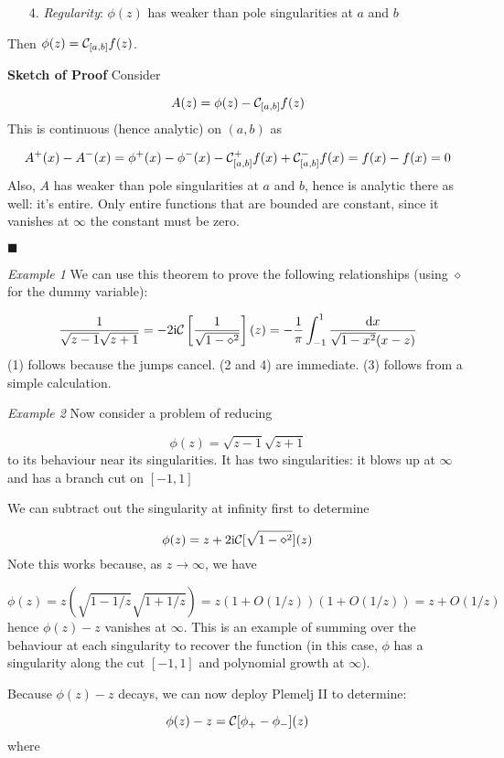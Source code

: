 \documentclass[12pt,a4paper]{article}
\def\D{ {\rm d} }
\def\I{ {\rm i} }
\def\CC{ {\cal C} }
\def\dx{\D x}
\begin{document}
\begin{itemize}
\item[4. ] \emph{Regularity}: $\phi(z)$ has weaker than pole singularities at $a$ and $b$

\end{itemize}
Then $\phi(z) = {\cal C}_{[a,b]} f(z)$.

\textbf{Sketch of Proof} Consider

\[
A(z) = \phi(z) - {\cal C}_{[a,b]} f(z)
\]
This is continuous (hence analytic) on $(a,b)$ as

\[
A^+(x) - A^-(x) = \phi^+(x) -\phi^-(x) - {\cal C}_{[a,b]}^+ f(x) + {\cal C}_{[a,b]}^- f(x)  =f(x) - f(x) = 0
\]
Also, $A$ has weaker than pole singularities at $a$ and $b$, hence is analytic there as well: it's entire. Only entire functions that are bounded are constant, since it vanishes at $\infty$ the constant must be zero.

\ensuremath{\blacksquare}

\emph{Example 1} We can use this theorem to prove the following relationships  (using $\diamond$ for the dummy variable):

\[
{1 \over \sqrt{z-1} \sqrt{z+1}} = -2 \I {\cal C}\left[{1 \over \sqrt{1-\diamond^2}}\right](z) =
-{1 \over \pi}\int_{-1}^1 {\dx \over \sqrt{1-x^2} (x-z)}
\]
(1) follows because the jumps cancel. (2 and 4) are immediate. (3) follows from a simple calculation.

\emph{Example 2} Now consider a problem of reducing

\[
\phi(z) = \sqrt{z-1} \sqrt{z+1}
\]
to its behaviour near its singularities. It has two singularities: it blows up at $\infty$ and has a branch cut on $[-1,1]$

We can subtract out the singularity at infinity first to determine

\[
\phi(z) = z  + 2 \I {\cal C}[\sqrt{1-\diamond^2}](z)
\]
Note this works because, as $z \rightarrow \infty$, we have

\[
\phi(z) = z (\sqrt{1-{1/z}}\sqrt{1 + {1/z}}) = z (1 + O({1/z}))(1+O(1/z)) = z + O(1/z)
\]
hence $\phi(z) - z$ vanishes at $\infty$. This is an example of summing over the behaviour at each singularity to recover the function (in this case, $\phi$ has a singularity along the cut $[-1,1]$ and polynomial growth at $\infty$).

Because $\phi(z)-z$ decays, we can now deploy Plemelj II to determine:

\[
\phi(z) -z = \CC[\phi_+-\phi_-](z)
\]
where
\end{document}
